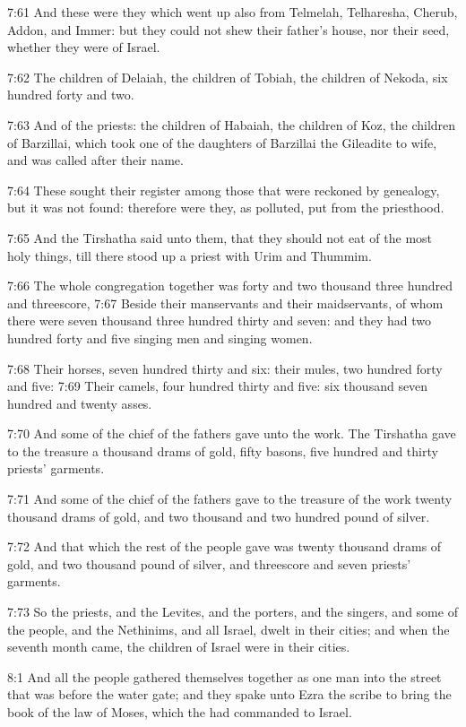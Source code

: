 7:61 And these were they which went up also from Telmelah, Telharesha, Cherub, Addon, and Immer: but they could not shew their father's house, nor their seed, whether they were of Israel.

7:62 The children of Delaiah, the children of Tobiah, the children of Nekoda, six hundred forty and two.

7:63 And of the priests: the children of Habaiah, the children of Koz, the children of Barzillai, which took one of the daughters of Barzillai the Gileadite to wife, and was called after their name.

7:64 These sought their register among those that were reckoned by genealogy, but it was not found: therefore were they, as polluted, put from the priesthood.

7:65 And the Tirshatha said unto them, that they should not eat of the most holy things, till there stood up a priest with Urim and Thummim.

7:66 The whole congregation together was forty and two thousand three hundred and threescore, 7:67 Beside their manservants and their maidservants, of whom there were seven thousand three hundred thirty and seven: and they had two hundred forty and five singing men and singing women.

7:68 Their horses, seven hundred thirty and six: their mules, two hundred forty and five: 7:69 Their camels, four hundred thirty and five: six thousand seven hundred and twenty asses.

7:70 And some of the chief of the fathers gave unto the work. The Tirshatha gave to the treasure a thousand drams of gold, fifty basons, five hundred and thirty priests' garments.

7:71 And some of the chief of the fathers gave to the treasure of the work twenty thousand drams of gold, and two thousand and two hundred pound of silver.

7:72 And that which the rest of the people gave was twenty thousand drams of gold, and two thousand pound of silver, and threescore and seven priests' garments.

7:73 So the priests, and the Levites, and the porters, and the singers, and some of the people, and the Nethinims, and all Israel, dwelt in their cities; and when the seventh month came, the children of Israel were in their cities.

8:1 And all the people gathered themselves together as one man into the street that was before the water gate; and they spake unto Ezra the scribe to bring the book of the law of Moses, which the \LORD had commanded to Israel.

